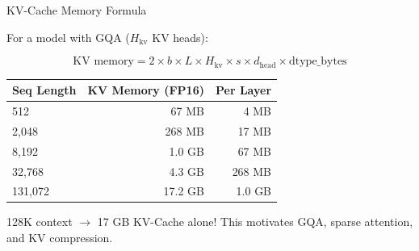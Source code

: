 \documentclass[aspectratio=169, 11pt]{beamer}
\begin{document}
\begin{frame}{KV-Cache Memory Formula}

	For a model with GQA ($H_{\text{kv}}$ KV heads):

	$$\text{KV memory} = 2 \times b \times L \times H_{\text{kv}} \times s \times d_{\text{head}} \times \text{dtype\_bytes}$$

	\begin{center}
		\small
		\begin{tabular}{@{}lrr@{}}
			\toprule
			\textbf{Seq Length} & \textbf{KV Memory (FP16)} & \textbf{Per Layer} \\
			\midrule
			512                 & 67 MB                     & 4 MB               \\
			2,048               & 268 MB                    & 17 MB              \\
			8,192               & 1.0 GB                    & 67 MB              \\
			32,768              & 4.3 GB                    & 268 MB             \\
			131,072             & 17.2 GB                   & 1.0 GB             \\
			\bottomrule
		\end{tabular}
	\end{center}

	\begin{alertblock}{128K context $\rightarrow$ 17 GB KV-Cache alone!}
		This motivates GQA, sparse attention, and KV compression.
	\end{alertblock}

\end{frame}
\end{document}
